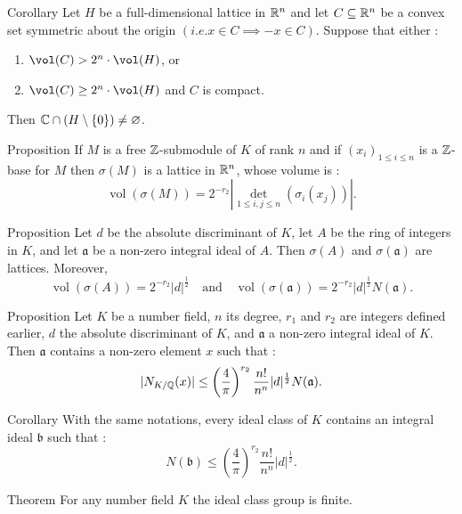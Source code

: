 \documentclass[9pt]{beamer}
\def\Z{\ensuremath\mathbb{Z}}
\def\C{\ensuremath\mathbb{C}}
\def\Q{\ensuremath\mathbb{Q}}
\def\R{\ensuremath\mathbb{R}}
\newcommand{\fraka}{\ensuremath{\mathfrak{a}}}
\begin{document}
\begin{frame}
  \begin{block}{Corollary}
    Let $H$ be a full-dimensional lattice in $\R^n$ and let $C\subseteq \R^n$ be a convex set symmetric about the origin $(i.e. x\in C \implies -x\in C)$. Suppose that either :
    \begin{enumerate}
      \item $\vol(C) >  2^n \cdot \vol(H)$, or
      \item $\vol(C) \geq  2^n \cdot \vol(H)$ and $C$ is compact.
    \end{enumerate}
    Then $ \C\cap (H\setminus\{0\})\neq \varnothing$.
  \end{block}
\end{frame}

\begin{frame}
  \begin{block}{Proposition}
    If $M$ is a free $\Z$-submodule of $K$ of rank $n$ and if $(x_i)_{1\leq i\leq n}$ is a $\Z$-base for $M$ then $\sigma(M)$ is a lattice in $\R^n$, whose volume is :
    \[\operatorname{vol}(\sigma(M)) = 2^{-r_2}|\det_{1\leq i,j\leq n}(\sigma_i(x_j))|.\]
  \end{block}

\end{frame}

\begin{frame}
  \begin{block}{Proposition}
    Let $d$ be the absolute discriminant of $K$, let $A$ be the ring of integers in $K$, and let $\mathfrak{a}$ be a non-zero integral ideal of $A$. Then $\sigma(A)$ and $\sigma(\mathfrak{a})$ are lattices. Moreover,
    \[\operatorname{vol}(\sigma(A)) = 2^{-r_2}|d|^{\frac12}\quad\text{and}\quad \operatorname{vol}(\sigma(\fraka)) = 2^{-r_2}|d|^{\frac12}N(\fraka).\]
  \end{block}
\end{frame}

\begin{frame}
  \begin{block}{Proposition}
    Let $K$ be a number field, $n$ its degree, $r_1$ and $r_2$ are integers defined earlier, $d$ the absolute discriminant of $K$, and $\mathfrak{a}$ a non-zero integral ideal of $K$. Then $\fraka$ contains a non-zero element $x$ such that :
    \[|N_{K/\Q}(x)|\leq \left(\frac{4}{\pi}\right)^{r_2}\frac{n!}{n^n}|d|^{\frac12}N(\mathfrak{a}).\]
  \end{block}
\end{frame}

\begin{frame}
  \begin{block}{Corollary}
    With the same notations, every ideal class of $K$ contains an integral ideal $\mathfrak{b}$ such that :
    \[N(\mathfrak{b}) \leq \left(\frac{4}{\pi}\right)^{r_2}\frac{n!}{n^n}|d|^{\frac12}.\]
  \end{block}
\end{frame}

\begin{frame}
  \begin{block}{Theorem}
    For any number field $K$ the ideal class group is finite.
  \end{block}
\end{frame}
\end{document}
